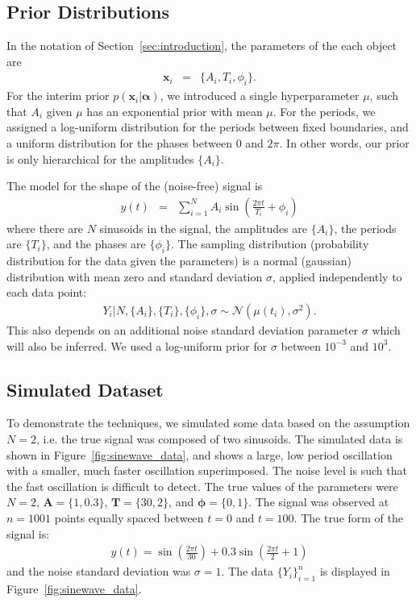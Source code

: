 \documentclass[letterpaper, 11pt]{article}
\newcommand{\hyperparams}{\boldsymbol{\alpha}}
\newcommand{\xx}{\mathbf{x}}
\begin{document}
\subsection{Prior Distributions}
In the notation of Section~\ref{sec:introduction}, the parameters of the
each object are
\begin{eqnarray}
\xx_i &=& \{A_i, T_i, \phi_i\}.
\end{eqnarray}
For the interim prior $p(\xx_i | \hyperparams)$, we introduced a single
hyperparameter $\mu$, such that $A_i$ given $\mu$ has an exponential prior
with mean $\mu$. For the periods, we assigned a log-uniform distribution for
the periods between fixed boundaries, and a uniform distribution for the phases
between 0 and $2\pi$. In other words, our prior is only hierarchical for the
amplitudes $\{A_i\}$.

The model for the shape of the (noise-free) signal is
\begin{eqnarray}
y(t) &=& \sum_{i=1}^N A_i \sin \left(\frac{2\pi t}{T_i} + \phi_i\right)
\end{eqnarray}
where there are $N$ sinusoids in the signal, the
amplitudes are $\{A_i\}$, the periods are $\{T_i\}$, and the phases are
$\{\phi_i\}$.
The sampling distribution (probability distribution for the data given the
parameters) is a normal (gaussian) distribution with mean zero and standard
deviation $\sigma$, applied independently to each data point:
\begin{eqnarray}
Y_i | N, \{A_i\}, \{T_i\}, \{\phi_i\}, \sigma \sim
\mathcal{N}\left(\mu(t_i), \sigma^2\right).
\end{eqnarray}
This also depends on an additional noise standard deviation parameter $\sigma$
which will also be inferred. We used a log-uniform prior for $\sigma$ between
$10^{-3}$ and $10^{3}$.

\subsection{Simulated Dataset}
To demonstrate the techniques,
we simulated some data based on the assumption $N=2$, i.e. the true signal was
composed of two sinusoids.
The simulated data is shown in Figure~\ref{fig:sinewave_data}, and shows a
large, low period oscillation with a smaller, much faster oscillation
superimposed. The noise level is such that the fast oscillation is difficult
to detect. The true values of the parameters were
$N=2$, $\mathbf{A} = \{1, 0.3\}$,
$\mathbf{T}=\{30, 2\}$, and $\boldsymbol{\phi} = \{0, 1\}$. The signal was
observed at $n=1001$ points equally spaced between $t=0$ and $t=100$.
The true form of the signal is:
\begin{eqnarray}
y(t) = \sin\left(\frac{2\pi t}{30}\right) +
0.3 \sin\left(\frac{2\pi t}{2} + 1\right)
\end{eqnarray}
and the noise standard deviation was $\sigma = 1$. The data $\{Y_i\}_{i=1}^n$
is displayed in Figure~\ref{fig:sinewave_data}.
\end{document}
